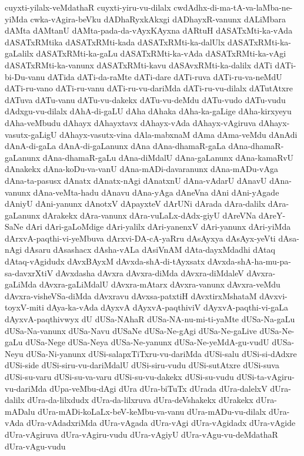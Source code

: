 {cuyxti-yilalx-veMdathaR
cuyxti-yiru-vu-dilalx
cwdAdhx-di-ma-tA-va-laMba-ne-yiMda
cwka-vAgira-beVku
dADhaRyxkAkxgi
dADhayxR-vanunx
dALiMbara
dAMta
dAMtanU
dAMta-pada-da-vAyxKAyxna
dARtuH
dASATxMti-ka-vAda
dASATxRMtika
dASATxRMti-kada
dASATxRMti-ka-dalUlx
dASATxRMti-ka-gaLalilx
dASATxRMti-ka-gaLu
dASATxRMti-ka-vAda
dASATxRMti-ka-vAgi
dASATxRMti-ka-vanunx
dASATxRMti-kavu
dASAvxRMti-ka-dalilx
dATi
dATi-bi-Du-vanu
dATida
dATi-da-raMte
dATi-dare
dATi-ruva
dATi-ru-va-neMdU
dATi-ru-vano
dATi-ru-vanu
dATi-ru-vu-dariMda
dATi-ru-vu-dilalx
dATutAtxre
dATuva
dATu-vanu
dATu-vu-dakekx
dATu-vu-deMdu
dATu-vudo
dATu-vudu
dAdxgu-vu-dilalx
dAhA-di-gaLU
dAha
dAhaka
dAha-ka-gaLige
dAha-kirxyeyu
dAha-veMbudu
dAhayx
dAhayxtavx
dAhayx-vAda
dAhayx-vAgiruva
dAhayx-vasutx-gaLigU
dAhayx-vasutx-vina
dAla-mabxnaM
dAma
dAma-veMdu
dAnAdi
dAnA-di-gaLa
dAnA-di-gaLanunx
dAna
dAna-dhamaR-gaLa
dAna-dhamaR-gaLanunx
dAna-dhamaR-gaLu
dAna-diMdalU
dAna-gaLanunx
dAna-kamaRvU
dAnakekx
dAna-koDu-va-vanU
dAna-mADi-davaranunx
dAna-mADu-vAga
dAna-ta-pasusx
dAnatx
dAnatx-nAgi
dAnatxnU
dAna-vAdarU
dAnavU
dAna-vanunx
dAna-veMta-hadu
dAnavu
dAna-yAga
dAneVna
dAni
dAni-yAgade
dAniyU
dAni-yanunx
dAnotxV
dApayxteV
dArUNi
dArada
dAra-dalilx
dAra-gaLanunx
dArakekx
dAra-vanunx
dAra-vuLaLx-dAdx-giyU
dAreVNa
dAreY-SaNe
dAri
dAri-gaLoMdige
dAri-yalilx
dAri-yanenxV
dAri-yanunx
dAri-yiMda
dArxvA-paqthi-vi-yeMbuva
dArxvi-DA-cA-yaRru
dAsAyxya
dAsAyx-yeVti
dAsa-nAgi
dAsaru
dAsashacx
dAsha-vALa
dAsiVnAM
dAta-dayxMdadhi
dAtaq
dAtaq-vAgidudx
dAvxBAyxM
dAvxda-shA-di-tAyxsatx
dAvxda-shA-ha-mu-pa-sa-davxrXtiV
dAvxdasha
dAvxra
dAvxra-diMda
dAvxra-diMdaleV
dAvxra-gaLiMda
dAvxra-gaLiMdalU
dAvxra-mAtarx
dAvxra-vanunx
dAvxra-veMdu
dAvxra-visheVSa-diMda
dAvxravu
dAvxsa-patxtiH
dAvxtirxMshataM
dAvxvi-toyxV-miti
dAya-ka-vAda
dAyxvA
dAyxvA-paqthiviV
dAyxvA-paqthi-vi-gaLa
dAyxvA-paqthivwyx
dU
dUSa-NAhaR
dUSa-NA-nu-mi-ti-yaMte
dUSa-Na-gaLu
dUSa-Na-vanunx
dUSa-Navu
dUSaNe
dUSa-Ne-gAgi
dUSa-Ne-gaLive
dUSa-Ne-gaLu
dUSa-Nege
dUSa-Neya
dUSa-Ne-yanunx
dUSa-Ne-yeMdA-gu-vudU
dUSa-Neyu
dUSa-Ni-yanunx
dUSi-salapxTiTxru-vu-dariMda
dUSi-salu
dUSi-si-dAdxre
dUSi-side
dUSi-siru-vu-dariMdalU
dUSi-siru-vudu
dUSi-sutAtxre
dUSi-suva
dUSi-su-varu
dUSi-su-va-varu
dUSi-su-vu-dakekx
dUSi-su-vudu
dUSi-ta-vAgiru-vu-dariMda
dUpa-veMbu-dAgi
dUra
dUra-biTuTx
dUrada
dUra-dalelxV
dUra-dalilx
dUra-da-lilxdudx
dUra-da-lilxruva
dUra-deVshakekx
dUrakekx
dUra-mADalu
dUra-mADi-koLaLx-beV-keMbu-va-vanu
dUra-mADu-vu-dilalx
dUra-vAda
dUra-vAdadxriMda
dUra-vAgada
dUra-vAgi
dUra-vAgidadx
dUra-vAgide
dUra-vAgiruva
dUra-vAgiru-vudu
dUra-vAgiyU
dUra-vAgu-vu-deMdathaR
dUra-vAgu-vudu
}

